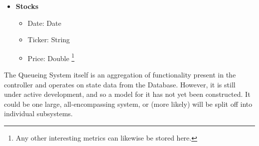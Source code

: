 \begin{itemize}
\begin{itemize}
		\item Investor ID: Integer
		\item Time Ordered: Date
		\item Time Executed: Date
		\item Ticker: String
		\item Order Type: String \footnote{Market, Stop, Limit}
		\item Transaction Type: String \footnote{Buy, Sell, Short, Cover}
		\item Quantity: Integer
		\item Duration Valid: Date
		\end{itemize}
	\item \textbf{Stocks}
		\begin{itemize}
		\item Date: Date
		\item Ticker: String
		\item Price: Double \footnote{Any other interesting metrics can likewise
			be stored here.}
		\end{itemize}
\end{itemize}

The Queueing System itself is an aggregation of functionality
present in the controller and operates on state data from the Database. However,
it is still under active development, and so a model for it has not yet been 
constructed. It could be one large, all-encompassing system, or (more likely)
will be split off into individual subsystems.



